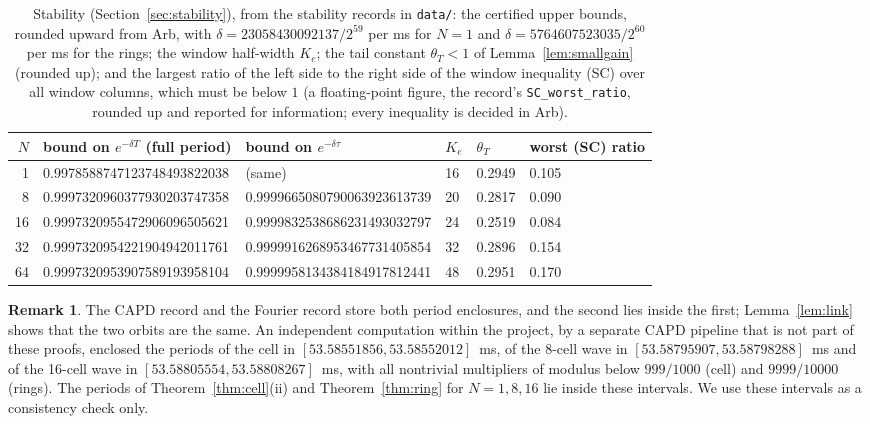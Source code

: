 \documentclass[11pt]{article}
\theoremstyle{definition}
\newtheorem{remark}[lemma]{Remark}
\begin{document}
\begin{table}[ht]
\centering\small
\begin{tabular}{@{}rlllll@{}}
\toprule
$N$ & bound on $e^{-\delta T}$ (full period) & bound on $e^{-\delta\tau}$ & $K_e$ & $\theta_T$ & worst (SC) ratio \\
\midrule
1 & 0.9978588747123748493822038 & (same) & 16 & 0.2949 & 0.105 \\
8 & 0.9997320960377930203747358 & 0.9999665080790063923613739 & 20 & 0.2817 & 0.090 \\
16 & 0.9997320955472906096505621 & 0.9999832538686231493032797 & 24 & 0.2519 & 0.084 \\
32 & 0.9997320954221904942011761 & 0.9999916268953467731405854 & 32 & 0.2896 & 0.154 \\
64 & 0.9997320953907589193958104 & 0.9999958134384184917812441 & 48 & 0.2951 & 0.170 \\
\bottomrule
\end{tabular}
\caption{Stability (Section~\ref{sec:stability}), from the stability records in \texttt{data/}: the certified upper bounds, rounded upward from Arb, with $\delta = 23058430092137/2^{59}$ per ms for $N = 1$ and $\delta = 5764607523035/2^{60}$ per ms for the rings; the window half-width $K_e$; the tail constant $\theta_T < 1$ of Lemma~\ref{lem:smallgain} (rounded up); and the largest ratio of the left side to the right side of the window inequality (SC) over all window columns, which must be below $1$ (a floating-point figure, the record's \texttt{SC\_worst\_ratio}, rounded up and reported for information; every inequality is decided in Arb).}
\label{tab:stability}
\end{table}

\begin{remark}\label{rem:same}
The CAPD record  and the Fourier record  store both period enclosures, and the second lies inside the first; Lemma~\ref{lem:link} shows that the two orbits are the same. An independent computation within the project, by a separate CAPD pipeline that is not part of these proofs, enclosed the periods of the cell in $[53.58551856, 53.58552012]$~ms, of the 8-cell wave in $[53.58795907, 53.58798288]$~ms and of the 16-cell wave in $[53.58805554, 53.58808267]$~ms, with all nontrivial multipliers of modulus below $999/1000$ (cell) and $9999/10000$ (rings). The periods of Theorem~\ref{thm:cell}(ii) and Theorem~\ref{thm:ring} for $N = 1, 8, 16$ lie inside these intervals. We use these intervals as a consistency check only.
\end{remark}
\end{document}

